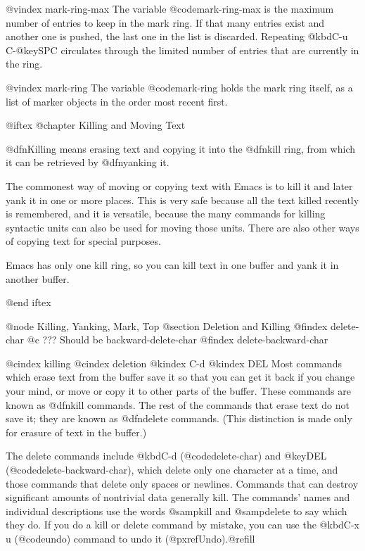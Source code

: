 {{{{{{@vindex mark-ring-max
  The variable @code{mark-ring-max} is the maximum number of entries to
keep in the mark ring.  If that many entries exist and another one is
pushed, the last one in the list is discarded.  Repeating @kbd{C-u
C-@key{SPC}} circulates through the limited number of entries that are
currently in the ring.

@vindex mark-ring
  The variable @code{mark-ring} holds the mark ring itself, as a list of
marker objects in the order most recent first.

@iftex
@chapter Killing and Moving Text

  @dfn{Killing} means erasing text and copying it into the @dfn{kill ring},
from which it can be retrieved by @dfn{yanking} it.

  The commonest way of moving or copying text with Emacs is to kill it and
later yank it in one or more places.  This is very safe because all the
text killed recently is remembered, and it is versatile, because the many
commands for killing syntactic units can also be used for moving those
units.  There are also other ways of copying text for special purposes.

  Emacs has only one kill ring, so you can kill text in one buffer and yank
it in another buffer.

@end iftex

@node Killing, Yanking, Mark, Top
@section Deletion and Killing
@findex delete-char
@c ??? Should be backward-delete-char
@findex delete-backward-char

@cindex killing
@cindex deletion
@kindex C-d
@kindex DEL
  Most commands which erase text from the buffer save it so that you can
get it back if you change your mind, or move or copy it to other parts of
the buffer.  These commands are known as @dfn{kill} commands.  The rest of
the commands that erase text do not save it; they are known as @dfn{delete}
commands.  (This distinction is made only for erasure of text in the
buffer.)

  The delete commands include @kbd{C-d} (@code{delete-char}) and
@key{DEL} (@code{delete-backward-char}), which delete only one character at
a time, and those commands that delete only spaces or newlines.  Commands
that can destroy significant amounts of nontrivial data generally kill.
The commands' names and individual descriptions use the words @samp{kill}
and @samp{delete} to say which they do.  If you do a kill or delete command
by mistake, you can use the @kbd{C-x u} (@code{undo}) command to undo it
(@pxref{Undo}).@refill

}}}}}}
